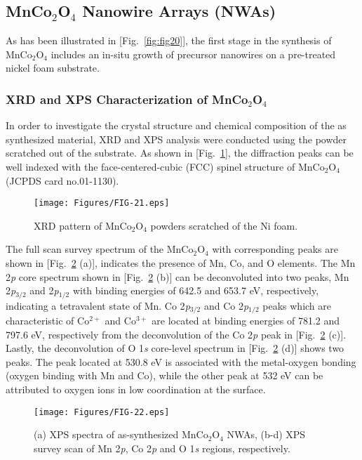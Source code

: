 \documentclass[reprint,amsmath,amssymb,aps,floatfix,
]{revtex4-2}
\begin{document}
\subsection{\label{sec:level3}MnCo$_2$O$_4$ Nanowire Arrays (NWAs)}
As has been illustrated in [Fig.~\ref{fig:fig20}], the first stage in the synthesis of MnCo$_2$O$_4$ includes an in-situ growth of precursor nanowires on a pre-treated nickel foam substrate.
\subsubsection{XRD and XPS Characterization of MnCo$_2$O$_4$}
In order to investigate the crystal structure and chemical composition of the as synthesized material, XRD and XPS analysis were conducted using the powder scratched out of the substrate. As shown in [Fig.~\ref{fig:fig21}], the diffraction peaks can be well indexed with the face-centered-cubic (FCC) spinel structure of MnCo$_2$O$_4$ (JCPDS card no.01-1130).\cite{Kwun2016}
\begin{figure}[b]
    \centering
    \texttt{[image: Figures/FIG-21.eps]}
    \caption{\label{fig:fig21}XRD pattern of MnCo$_2$O$_4$ powders scratched of the Ni foam.}
    \end{figure}
The full scan survey spectrum of the MnCo$_2$O$_4$ with corresponding peaks are shown in [Fig.~\ref{fig:fig22} (a)], indicates the presence of Mn, Co, and O elements. The Mn 2{\it p} core spectrum shown in [Fig.~\ref{fig:fig22} (b)] can be deconvoluted into two peaks, Mn 2{\it p}$_{3/2}$ and 2{\it p}$_{1/2}$ with binding energies of 642.5 and 653.7 eV, respectively, indicating a tetravalent state of Mn.\cite{Wang2016} Co 2{\it p}$_{3/2}$ and Co 2{\it p}$_{1/2}$ peaks which are characteristic of Co$^{2+}$ and Co$^{3+}$ are located at binding energies of 781.2 and 797.6 eV, respectively from the deconvolution of the Co 2{\it p} peak in [Fig.~\ref{fig:fig22} (c)].\cite{Zhang2017} Lastly, the deconvolution of O 1{\it s} core-level spectrum in [Fig.~\ref{fig:fig22} (d)] shows two peaks. The peak located at 530.8 eV is associated with the metal-oxygen bonding (oxygen binding with Mn and Co), while the other peak at 532 eV can be attributed to oxygen ions in low coordination at the surface.\cite{Socratous2015}
\begin{figure}[t]
    \centering
    \texttt{[image: Figures/FIG-22.eps]}
    \caption{\label{fig:fig22}(a) XPS spectra of as-synthesized MnCo$_2$O$_4$ NWAs, (b-d) XPS survey scan of Mn 2{\it p}, Co 2{\it p} and O 1{\it s} regions, respectively.}
    \end{figure}
\end{document}
